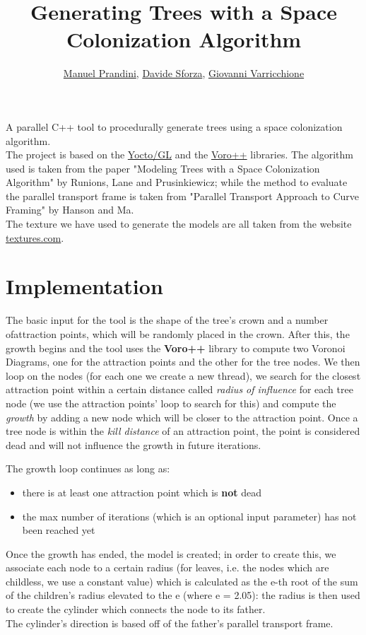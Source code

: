 \documentclass[10pt,a4paper]{article}
\author{\href{https://github.com/ManuelPrandini}{Manuel Prandini}, \href{https://github.com/dsforza96}{Davide Sforza}, \href{https://github.com/giovannivarr}{Giovanni Varricchione}}
\title{Generating Trees with a Space Colonization Algorithm}
\begin{document}
\maketitle

A parallel C++ tool to procedurally generate trees using a space colonization
algorithm. \\

The project is based on the \href{https://github.com/xelatihy/yocto-gl}{Yocto/GL} and the \href{http://math.lbl.gov/voro++/}{Voro++} libraries. The algorithm used is taken from the paper "Modeling Trees with a Space Colonization Algorithm" by Runions, Lane and Prusinkiewicz; while the method to evaluate the parallel transport frame is taken from "Parallel Transport Approach to Curve Framing" by Hanson and Ma. \\

The texture we have used to generate the models are all taken from the website \href{https://textures.com}{textures.com}.

\section{Implementation}

The basic input for the tool is the shape of the tree's crown and a number ofattraction points, which will be randomly placed in the crown. After this, the growth begins and the tool uses the \textbf{Voro++} library to compute two Voronoi Diagrams, one for the attraction points and the other for the tree nodes. We then loop on the nodes (for each one we create a new thread), we search for the closest attraction point  within a certain distance called \textit{radius of influence} for each tree node (we use the attraction points' loop to search for this) and compute the \textit{growth} by adding a new node which will be closer to the attraction point. Once a tree node is within the \textit{kill distance} of an attraction point, the point is considered dead and will not influence the growth in future iterations.

The growth loop continues as long as:
 \begin{itemize}
 	\item there is at least one attraction point which is \textbf{not} dead
  	\item the max number of iterations (which is an optional input parameter) has not been reached yet
  \end{itemize}

Once the growth has ended, the model is created; in order to create this, we associate each node to a certain radius (for leaves, i.e. the nodes which are childless, we use a constant value) which is calculated as the e-th root of the sum of the children's radius elevated to the e  (where e = 2.05): the radius is then used to create the cylinder which connects the node to its father. \\
The cylinder's direction is based off of the father's parallel transport frame.
\end{document}
